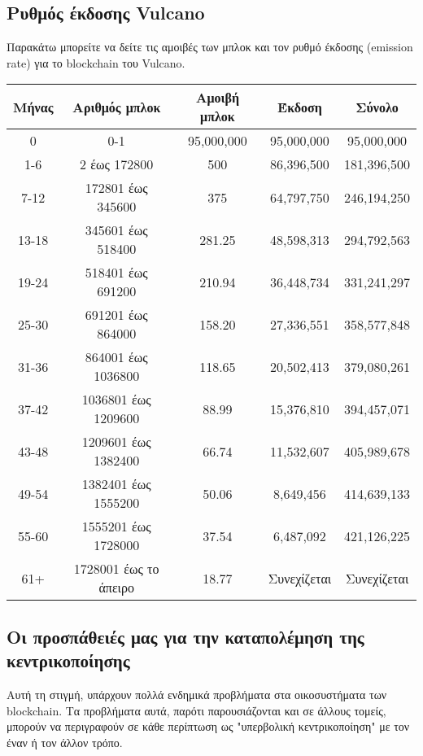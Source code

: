 \documentclass[A4paper, 12pt]{article}
\begin{document}
\subsection{Ρυθμός έκδοσης Vulcano}
Παρακάτω μπορείτε να δείτε τις αμοιβές των μπλοκ και τον ρυθμό έκδοσης (emission rate) για το blockchain του Vulcano.
\begin{table}[h]
\centering
\begin{tabular}{@{}ccccc@{}}
\toprule
Μήνας & Αριθμός μπλοκ & Αμοιβή μπλοκ & Έκδοση & Σύνολο \\ \midrule
0 & 0-1 & 95,000,000 & 95,000,000 & 95,000,000 \\
1-6 & 2 έως 172800 & 500 & 86,396,500 & 181,396,500 \\
7-12 & 172801 έως 345600 & 375 & 64,797,750 & 246,194,250 \\
13-18 & 345601 έως 518400 & 281.25 & 48,598,313 & 294,792,563 \\
19-24 & 518401 έως 691200 & 210.94 & 36,448,734 & 331,241,297 \\
25-30 & 691201 έως 864000 & 158.20 & 27,336,551 & 358,577,848 \\
31-36 & 864001 έως 1036800 & 118.65 & 20,502,413 & 379,080,261 \\
37-42 & 1036801 έως 1209600 & 88.99 & 15,376,810 & 394,457,071 \\
43-48 & 1209601 έως 1382400 & 66.74 & 11,532,607 & 405,989,678 \\
49-54 & 1382401 έως 1555200 & 50.06 & 8,649,456 & 414,639,133 \\
55-60 & 1555201 έως 1728000 & 37.54 & 6,487,092 & 421,126,225 \\
61+ & 1728001 έως το άπειρο & 18.77 & Συνεχίζεται & Συνεχίζεται \\ \bottomrule
\end{tabular}
\end{table}

\subsection{Οι προσπάθειές μας για την καταπολέμηση της κεντρικοποίησης}
Αυτή τη στιγμή, υπάρχουν πολλά ενδημικά προβλήματα στα οικοσυστήματα των blockchain. Τα προβλήματα αυτά, παρότι παρουσιάζονται και σε άλλους τομείς, μπορούν να περιγραφούν σε κάθε περίπτωση ως "υπερβολική κεντρικοποίηση" με τον έναν ή τον άλλον τρόπο.
\end{document}
